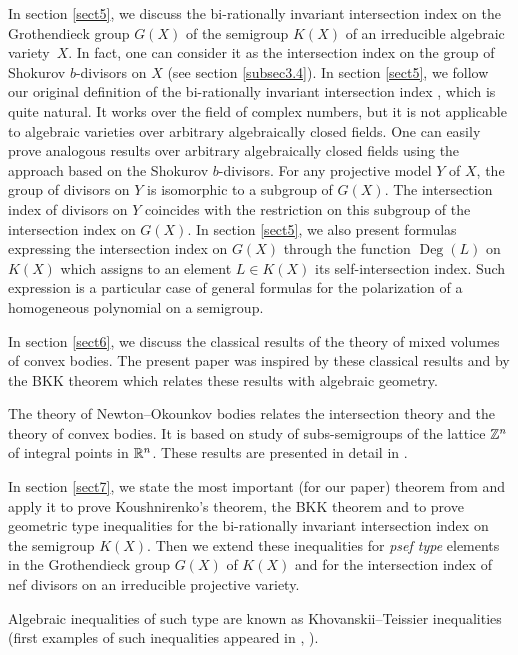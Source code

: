 \documentclass[11pt]{article}
\theoremstyle{plain}
\theoremstyle{definition}
\newcommand\D{\operatorname{Deg}}
\begin{document}
In section \ref{sect5}, we discuss the bi-rationally invariant intersection index on the Grothendieck group $G(X)$ of the semigroup $K(X)$ of an irreducible algebraic variety~$X$. In fact, one can consider it as the intersection  index on the group of Shokurov $b$-divisors on $X$ (see section \ref{subsec3.4}).  In section \ref{sect5}, we follow our original definition of the bi-rationally invariant intersection  index   \cite{K-K10}, which is quite natural. It works over the field of complex numbers, but it is not applicable to algebraic varieties over arbitrary algebraically closed fields. One can easily prove analogous results  over arbitrary algebraically closed fields using the approach based on the Shokurov $b$-divisors. For any projective model $Y$ of $X$, the group of  divisors on $Y$ is isomorphic to a subgroup of $G(X)$. The intersection index of  divisors on $Y$ coincides with the restriction on this subgroup of the intersection index on $G(X)$. In section \ref{sect5}, we also present formulas expressing the intersection index on $G(X)$ through the function $\D(L)$ on $K(X)$  which assigns to an element $L\in K(X)$ its self-intersection  index. Such expression  is a particular case of general formulas for the polarization of a homogeneous polynomial on a semigroup.

In section \ref{sect6}, we discuss the classical results of the theory of mixed volumes of convex bodies. The present paper was inspired by these
classical results and by the BKK theorem which relates these results with algebraic geometry.

The theory of Newton--Okounkov bodies  relates the intersection theory and the  theory of convex bodies.  It is based on  study of subs-semigroups of the lattice  $\Bbb Z^n$ of integral  points in $\Bbb R^n$. These results are presented in detail in  \cite{K-K12}.

In section \ref{sect7}, we state the most
important (for our paper) theorem   from  \cite{K-K12} and apply  it to prove Koushnirenko's theorem, the BKK  theorem and to prove geometric type inequalities for the bi-rationally invariant  intersection  index on the semigroup $K(X)$.
Then we extend these inequalities for  {\it psef type} elements in the Grothendieck group $G(X)$ of $K(X)$ and for the intersection index of nef  divisors on an irreducible projective variety.

Algebraic inequalities of such type are known as Khovanskii--Teissier inequalities (first examples  of such inequalities appeared in  \cite{Tei79},  \cite{Kh88}).
\end{document}
